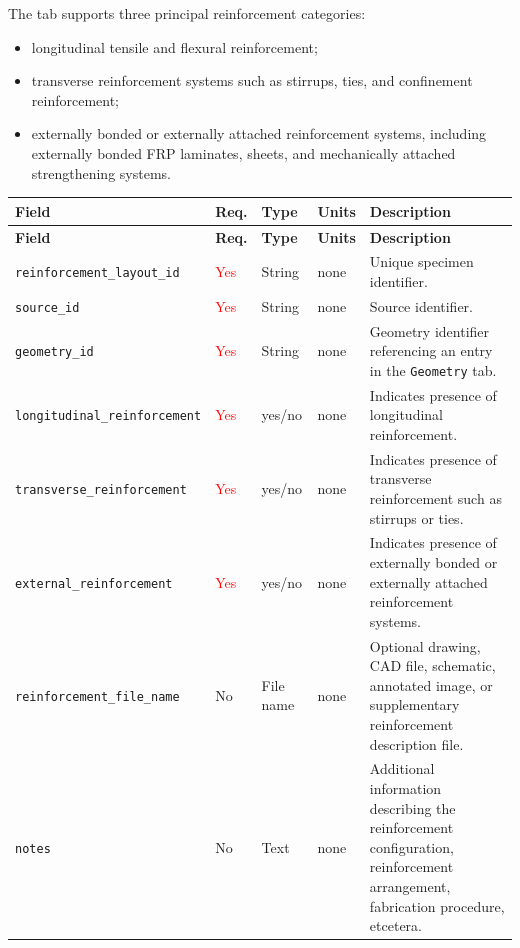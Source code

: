 \documentclass[11pt]{book}
\begin{document}
The tab supports three principal reinforcement categories:

\begin{itemize}
\item longitudinal tensile and flexural reinforcement;
\item transverse reinforcement systems such as stirrups, ties, and confinement reinforcement;
\item externally bonded or externally attached reinforcement systems, including externally bonded FRP laminates, sheets, and mechanically attached strengthening systems.
\end{itemize}



\begin{longtable}{>{\raggedright\arraybackslash}p{}
                  >{\raggedright\arraybackslash}p{}
                  >{\raggedright\arraybackslash}p{}
                  >{\raggedright\arraybackslash}p{}
                  >{\raggedright\arraybackslash}p{}}
\hline
\textbf{Field} &
\textbf{Req.} &
\textbf{Type} &
\textbf{Units} &
\textbf{Description} \\
\hline
\endfirsthead

\hline
\textbf{Field} &
\textbf{Req.} &
\textbf{Type} &
\textbf{Units} &
\textbf{Description} \\
\hline
\endhead

\texttt{reinforcement\_layout\_id} & \textcolor{red}{Yes} & String & none & Unique specimen identifier. \\

\texttt{source\_id} & \textcolor{red}{Yes} & String & none & Source identifier. \\

\texttt{geometry\_id} & \textcolor{red}{Yes} & String & none & Geometry identifier referencing an entry in the \texttt{Geometry} tab. \\

\texttt{longitudinal\_reinforcement} & \textcolor{red}{Yes} & yes/no & none & Indicates presence of longitudinal reinforcement. \\

\texttt{transverse\_reinforcement} & \textcolor{red}{Yes} & yes/no & none & Indicates presence of transverse reinforcement such as stirrups or ties. \\

\texttt{external\_reinforcement} & \textcolor{red}{Yes} & yes/no & none & Indicates presence of externally bonded or externally attached reinforcement systems. \\

\texttt{reinforcement\_file\_name} &
No &
File name &
none &
Optional drawing, CAD file, schematic, annotated image, or supplementary reinforcement description file. \\

\texttt{notes} & No & Text & none & Additional information describing the reinforcement configuration, reinforcement arrangement, fabrication procedure, etcetera. \\

\hline
\end{longtable}
\end{document}
